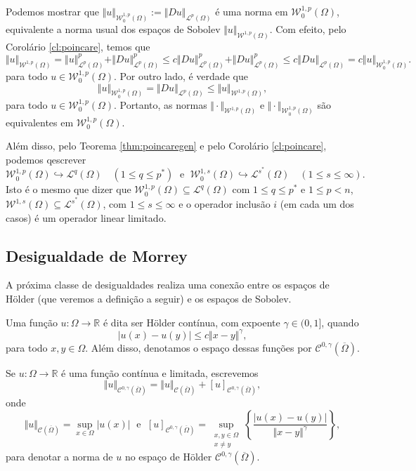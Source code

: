 \documentclass[a4paper, 11pt]{book}
\theoremstyle{definition}
\newcommand{\bR}{\mathbb{R}}
\newcommand{\cC}{\mathcal{C}}
\newcommand{\cL}{\mathcal{L}}
\newcommand{\cW}{\mathcal{W}}
\begin{document}
Podemos mostrar que $\Vert u \Vert_{\cW_0^{1,p}(\Omega)} := \Vert Du \Vert_{\cL^p(\Omega)}$ é uma norma em $\cW^{1,p}_0(\Omega)$, equivalente a norma usual dos espaços de Sobolev $\Vert u \Vert_{\cW^{1,p}(\Omega)}$. Com efeito, pelo Corolário \ref{cl:poincare}, temos que
\[
    \Vert u \Vert_{\cW^{1,p}(\Omega)} = \Vert u \Vert_{\cL^p(\Omega)}^p + \Vert Du \Vert_{\cL^p(\Omega)}^p \leqslant c \Vert Du \Vert_{\cL^p(\Omega)}^p + \Vert Du \Vert_{\cL^p(\Omega)}^p \leqslant c \Vert Du \Vert_{\cL^p(\Omega)} = c \Vert u \Vert_{\cW^{1,p}_0(\Omega)}.
\]
para todo $u \in \cW^{1,p}_0(\Omega)$.
Por outro lado, é verdade que
\[
    \Vert u \Vert_{\cW^{1,p}_0(\Omega)} = \Vert Du \Vert_{\cL^p(\Omega)} \leqslant \Vert u \Vert_{\cW^{1,p}(\Omega)},
\]
para todo $u \in \cW^{1,p}_0(\Omega)$.
Portanto, as normas $\Vert \cdot \Vert_{\cW^{1,p}(\Omega)}$ e $\Vert \cdot \Vert_{\cW^{1,p}_0(\Omega)}$ são equivalentes em $\cW^{1,p}_0(\Omega)$.

Além disso, pelo Teorema \ref{thm:poincaregen} e pelo Corolário \ref{cl:poincare}, podemos qescrever 
\[
    \cW^{1,p}_0(\Omega) \hookrightarrow \cL^q(\Omega) \quad (1 \leqslant q \leqslant p^*) \;\text{ e }\; \cW^{1,s}_0(\Omega) \hookrightarrow \cL^{s^*}(\Omega) \quad (1 \leqslant s \leqslant \infty).
\]
Isto é o mesmo que dizer que $\cW^{1,p}_0(\Omega) \subseteq \cL^q(\Omega)$ com $1 \leqslant q \leqslant p^*$ e $1 \leqslant p < n$, $\cW^{1,s}(\Omega) \subseteq \cL^{s^*}(\Omega)$, com $1 \leqslant s \leqslant \infty$ e o operador inclusão $i$ (em cada um dos casos) é um operador linear limitado.

\subsection{Desigualdade de Morrey}

A próxima classe de desigualdades realiza uma conexão entre os espaços de Hölder (que veremos a definição a seguir) e os espaços de Sobolev.

\begin{dbox}
    Uma função $u : \Omega \to \bR$ é dita ser Hölder contínua, com expoente $\gamma \in (0,1]$, quando
    \[
        |u(x) - u(y)| \leqslant c \Vert x - y \Vert^\gamma,
    \]
    para todo $x,y \in \Omega$. Além disso, denotamos o espaço dessas funções por $\cC^{0,\gamma}(\overline\Omega)$.
\end{dbox}

\begin{dbox}
    Se $u : \Omega \to \bR$ é uma função contínua e limitada, escrevemos
    \[
        \Vert u \Vert_{\cC^{0,\gamma}(\overline\Omega)} = \Vert u \Vert_{\cC(\overline\Omega)} + [u]_{\cC^{0,\gamma}(\overline\Omega)},
    \]
    onde
    \[
        \Vert u \Vert_{\cC(\overline\Omega)} = \sup_{x \in \Omega} |u(x)| \;\text{ e }\; [u]_{\cC^{0,\gamma}(\overline\Omega)} = \sup_{\substack{x,y \in \Omega\\x \neq y}} \left\{ \frac{|u(x) - u(y)|}{\Vert x - y \Vert^\gamma} \right\},
    \]
    para denotar a norma de $u$ no espaço de Hölder $\cC^{0,\gamma}(\overline\Omega)$.
\end{dbox}
\end{document}
